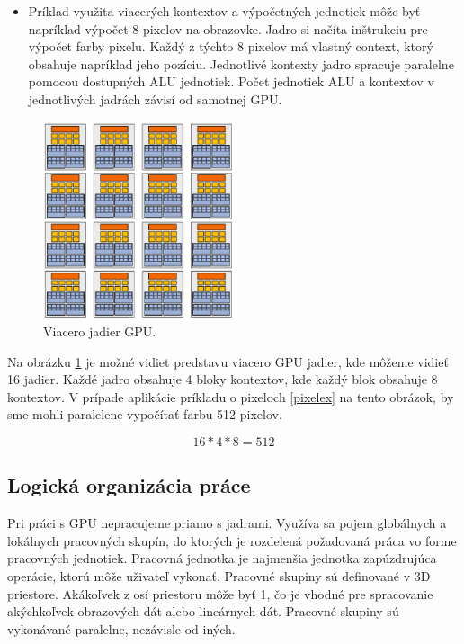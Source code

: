 \label{pixelex}
\begin{itemize}
  \item{Príklad využita viacerých kontextov a výpočetných jednotiek môže byť napríklad výpočet 8 pixelov na obrazovke. Jadro si načíta inštrukciu pre výpočet farby pixelu. Každý z týchto 8 pixelov má vlastný context, ktorý obsahuje napríklad jeho pozíciu. Jednotlivé kontexty jadro spracuje paralelne pomocou dostupných ALU jednotiek. Počet jednotiek ALU a kontextov v jednotlivých jadrách závisí od samotnej GPU.}
\end{itemize}

\begin{figure}[H]
	\centering
	\includegraphics[width=0.5\textwidth]{obrazky-figures/gpucores.eps}
	\caption{Viacero jadier GPU.}
	\label{gpucores}
\end{figure}

Na obrázku \ref{gpucores} je možné vidiet predstavu viacero GPU jadier, kde môžeme vidieť 16 jadier. Každé jadro obsahuje 4 bloky kontextov, kde každý blok obsahuje 8 kontextov. V prípade aplikácie príkladu o pixeloch \ref{pixelex} na tento obrázok, by sme mohli paralelene vypočítať farbu 512 pixelov.

\begin{equation}
	16 * 4 * 8 = 512
	\label{eq:pixeleq}
\end{equation}

\subsection*{Logická organizácia práce}
\label{workgrouplogic}
Pri práci s GPU nepracujeme priamo s jadrami. Využíva sa pojem globálnych a lokálnych pracovných skupín, do ktorých je rozdelená požadovaná práca vo forme pracovných jednotiek. Pracovná jednotka je najmenšia jednotka zapúzdrujúca operácie, ktorú môže uživateľ vykonať.
Pracovné skupiny sú definované v 3D priestore. Akákoľvek z osí priestoru môže byť 1, čo je vhodné pre spracovanie akýchkoľvek obrazových dát alebo lineárnych dát. Pracovné skupiny sú vykonávané paralelne, nezávisle od iných.

